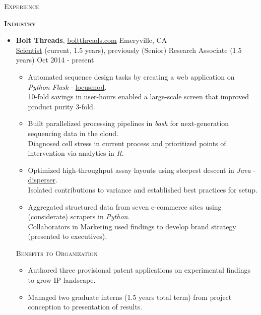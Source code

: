 \documentclass[10pt,letterpaper]{article}
\begin{document}
{\Large\textsc{Experience}} \smallbreak
\begin{minipage}{0.05\textwidth}
    \begin{sideways}{\bf\textsc{Industry}}\end{sideways}
\end{minipage}
\begin{minipage}{0.95\textwidth}
    \begin{itemize}
        \item \textbf{Bolt Threads}, \href{http://www.boltthreads.com}{boltthreads.com} \hfill{Emeryville, CA}\\
        \underline{Scientist} (current, 1.5 years), previously (Senior) Research Associate (1.5 years) \hfill{Oct 2014 - present}
        \begin{itemize}
            \item Automated sequence design tasks by creating a web application on \emph{Python Flask}
                - \href{http://www.github.com/thomasvstevens/locusmod}{locusmod}.
                \\10-fold savings in user-hours enabled a large-scale screen that improved product purity 3-fold.
            \item Built parallelized processing pipelines in \emph{bash} for next-generation sequencing data in the cloud.
                \\Diagnosed cell stress in current process and prioritized points of intervention via analytics in \emph{R}.
            \item Optimized high-throughput assay layouts using steepest descent in \emph{Java}
                - \href{http://www.github.com/thomasvstevens/disperser}{disperser}.
                \\Isolated contributions to variance and established best practices for setup.
            \item Aggregated structured data from seven e-commerce sites using (considerate) scrapers in \emph{Python}.
                \\Collaborators in Marketing used findings to develop brand strategy (presented to executives).
        \end{itemize}
        \textsc{Benefits to Organization}
        \begin{itemize}
            \item Authored three provisional patent applications on experimental findings to grow IP landscape.
            \item Managed two graduate interns (1.5 years total term) from project conception to presentation of results.

\end{itemize}
\end{itemize}
\end{minipage}
\end{document}
